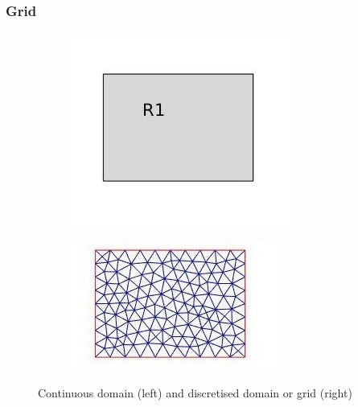 \documentclass{beamer}
\begin{document}

\begin{frame}
\frametitle{Grid}
\begin{figure}
\begin{subfigure}{0.45\textwidth}
\centering
  \includegraphics[width=\linewidth]{domain.jpg}
  \label{fig:Domain}
\end{subfigure}
\begin{subfigure}{0.45\textwidth}	
\centering
  \includegraphics[width=\linewidth]{grid.jpg}
  \label{fig:Mesh}
\end{subfigure}
\caption{Continuous domain (left) and discretised domain or grid (right)}
\label{fig:continuous_grid_figure}
\end{figure}

\end{frame}
\end{document}
